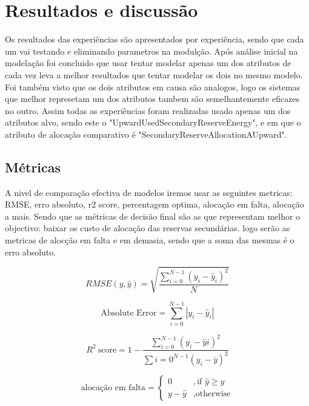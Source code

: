 \chapter{Resultados e discussão}

Os resultados das experiências são apresentados por experiência, sendo que cada um vai testando e eliminando parametros na modulção.
Após análise inicial na modelação foi concluido que usar tentar modelar apenas um dos atributos de cada vez leva a melhor resultados que tentar modelar os dois no mesmo modelo.
Foi também visto que os dois atributos em causa são analogos, logo os sistemas que melhor represetam um dos atributos tambem são semelhantemente eficazes no outro. 
Assim todas as experiências foram realizadas usado apenas um dos atributos alvo, sendo este o "UpwardUsedSecondaryReserveEnergy", e em que o atributo de alocação comparativo é  "SecondaryReserveAllocationAUpward".

\section{Métricas\label{se:metricas}}

A nivel de comparação efectiva de modelos iremos usar as seguintes metricas: RMSE, erro absoluto, r2 score, percentagem optima, alocação em falta, alocação a mais.
Sendo que as métricas de decisão final são as que representam melhor o objectivo: baixar os custo de alocação das reservas secundárias. logo serão as metricas de alocção em falta e em demasia, sendo que a soma das mesmas é o erro absoluto.

\begin{equation}
\label{eq:rmse}
    RMSE (y, \hat{y}) = \sqrt{\frac{\sum_{i=0}^{N - 1} (y_i - \hat{y}_i)^2}{N}}
\end{equation}

\begin{equation} \label{eq:abse} 
    \text{Absolute\ Error} = \sum_{i=0}^{N - 1} \left| y_i - \hat{y}_i \right| 
\end{equation}

\begin{equation} \label{eq:r2score} R^2\ \text{score} = 1 - \frac{\sum_{i=0}^{N - 1} (y_i - \hat{y}i)^2}{\sum{i=0}^{N - 1} (y_i - \bar{y})^2} \end{equation}


\begin{equation} 
    \label{eq:eq1} 
    \text{alocação em falta} = 
    \begin{cases} 
        0 & ,\text{if } \hat{y} \geq y \\
        y - \hat{y} & ,\text{otherwise} 
    \end{cases} 
\end{equation}


